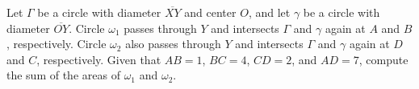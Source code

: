 Let $\Gamma$ be a circle with diameter $\overline{XY}$ and center $O$, and let $\gamma$ be a circle with diameter $\overline{OY}$. Circle $\omega_1$ passes through $Y$ and intersects $\Gamma$ and $\gamma$ again at $A$ and $B$, respectively. Circle $\omega_2$ also passes through $Y$ and intersects $\Gamma$ and $\gamma$ again at $D$ and $C$, respectively. Given that $AB=1$, $BC=4$, $CD=2$, and $AD=7$, compute the sum of the areas of $\omega_1$ and $\omega_2$.
